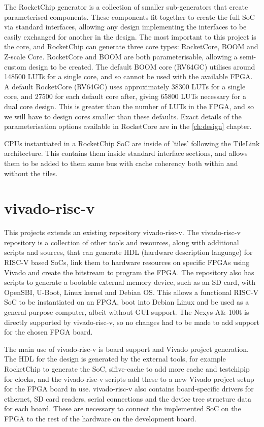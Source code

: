The RocketChip generator is a collection of smaller sub-generators that create parameterised components. These components fit together to create the full SoC via standard interfaces, allowing any design implementing the interfaces to be easily exchanged for another in the design. The most important to this project is the core, and RocketChip can generate three core types: RocketCore, BOOM and Z-scale Core. RocketCore and BOOM are both parameterisable, allowing a semi-custom design to be created. The default BOOM core (RV64GC) utilises around 148500 LUTs for a single core, and so cannot be used with the available FPGA. A default RocketCore (RV64GC) uses approximately 38300 LUTs for a single core, and 27500 for each default core after, giving 65800 LUTs necessary for a dual core design. This is greater than the number of LUTs in the FPGA, and so we will have to design cores smaller than these defaults. Exact details of the parameterisation options available in RocketCore are in the \ref{ch:design} chapter.

CPUs instantiated in a RocketChip SoC are inside of 'tiles' following the TileLink architecture. This contains them inside standard interface sections, and allows them to be added to them same bus with cache coherency both within and without the tiles. %

\section{vivado-risc-v}
\label{vivado-risc-v}
This projects extends an existing repository vivado-risc-v\cite{vivado-risc-v}. The vivado-risc-v repository is a collection of other tools and resources, along with additional scripts and sources, that can generate HDL (hardware description language) for RISC-V based SoCs, link them to hardware resources on specific FPGAs using Vivado and create the bitstream to program the FPGA. The repository also has scripts to generate a bootable external memory device, such as an SD card, with OpenSBI, U-Boot, Linux kernel and Debian OS. This allows a functional RISC-V SoC to be instantiated on an FPGA, boot into Debian Linux and be used as a general-purpose computer, albeit without GUI support. The Nexys-A&-100t is directly supported by vivado-risc-v, so no changes had to be made to add support for the chosen FPGA board.

The main use of vivado-risc-v is board support and Vivado project generation. The HDL for the design is generated by the external tools, for example RocketChip to generate the SoC, sifive-cache to add more cache and testchipip for clocks, and the vivado-risc-v scripts add these to a new Vivado project setup for the FPGA board in use. vivado-risc-v also contains board-specific drivers for ethernet, SD card readers, serial connections and the device tree structure data for each board. These are necessary to connect the implemented SoC on the FPGA to the rest of the hardware on the development board.

